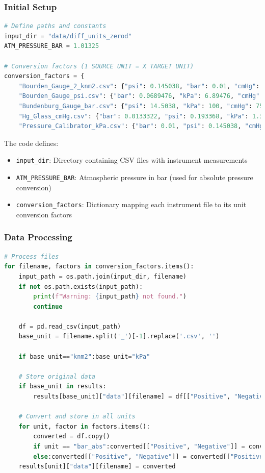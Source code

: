 \documentclass{article}
\begin{document}
\subsubsection{Initial Setup}
\vspace{-0.5em}
\begin{lstlisting}[language=Python]
# Define paths and constants
input_dir = "data/diff_units_zerod"
ATM_PRESSURE_BAR = 1.01325

# Conversion factors (1 SOURCE UNIT = X TARGET UNIT)
conversion_factors = {
	"Bourden_Gauge_2_knm2.csv": {"psi": 0.145038, "bar": 0.01, "cmHg": 0.750062, "kPa": 1.0, "bar_abs": 0.01},
	"Bourden_Gauge_psi.csv": {"bar": 0.0689476, "kPa": 6.89476, "cmHg": 5.17149, "bar_abs": 0.0689476},
	"Bundenburg_Gauge_bar.csv": {"psi": 14.5038, "kPa": 100, "cmHg": 75.0062, "bar_abs": 1.0},
	"Hg_Glass_cmHg.csv": {"bar": 0.0133322, "psi": 0.193368, "kPa": 1.33322, "bar_abs": 0.0133322},
	"Pressure_Calibrator_kPa.csv": {"bar": 0.01, "psi": 0.145038, "cmHg": 0.750062, "bar_abs": 0.01}}
\end{lstlisting}

The code defines:
\begin{itemize}[itemsep=-1mm]
	\item \texttt{input\_dir}: Directory containing CSV files with instrument measurements
	\item \texttt{ATM\_PRESSURE\_BAR}: Atmospheric pressure in bar (used for absolute pressure conversion)
	\item \texttt{conversion\_factors}: Dictionary mapping each instrument file to its unit conversion factors
\end{itemize}
\vspace{-1.4em}
\subsubsection{Data Processing}\vspace{-0.5em}
\begin{lstlisting}[language=Python]
# Process files
for filename, factors in conversion_factors.items():	
	input_path = os.path.join(input_dir, filename)
	if not os.path.exists(input_path):
		print(f"Warning: {input_path} not found.")
		continue
	
	df = pd.read_csv(input_path)
	base_unit = filename.split('_')[-1].replace('.csv', '')
	
	if base_unit=="knm2":base_unit="kPa"
	
	# Store original data
	if base_unit in results:
		results[base_unit]["data"][filename] = df[["Positive", "Negative"]]

	# Convert and store in all units
	for unit, factor in factors.items():
		converted = df.copy()
		if unit == "bar_abs":converted[["Positive", "Negative"]] = converted[["Positive", "Negative"]] * factor + ATM_PRESSURE_BAR
		else:converted[["Positive", "Negative"]] = converted[["Positive", "Negative"]] * factor
	results[unit]["data"][filename] = converted
\end{lstlisting}
\end{document}
